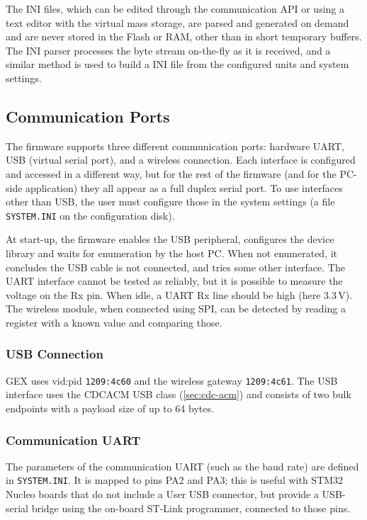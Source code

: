 The INI files, which can be edited through the communication \gls{API} or using a text editor with the virtual mass storage, are parsed and generated on demand and are never stored in the Flash or \gls{RAM}, other than in short temporary buffers. The INI parser processes the byte stream on-the-fly as it is received, and a similar method is used to build a INI file from the configured units and system settings.

\subsection{Communication Ports} \label{sec:com-ports}

The firmware supports three different communication ports: hardware \gls{UART}, \gls{USB} (virtual serial port), and a wireless connection. Each interface is configured and accessed in a different way, but for the rest of the firmware (and for the \gls{PC}-side application) they all appear as a full duplex serial port. To use interfaces other than \gls{USB}, the user must configure those in the system settings (a file \verb|SYSTEM.INI| on the configuration disk).

At start-up, the firmware enables the \gls{USB} peripheral, configures the device library and waits for enumeration by the host \gls{PC}. When not enumerated, it concludes the \gls{USB} cable is not connected, and tries some other interface. The \gls{UART} interface cannot be tested as reliably, but it is possible to measure the voltage on the Rx pin. When idle, a \gls{UART} Rx line should be high (here 3.3\,V). The wireless module, when connected using \gls{SPI}, can be detected by reading a register with a known value and comparing those.

\subsubsection{USB Connection}

GEX uses vid:pid \verb|1209:4c60| and the wireless gateway \verb|1209:4c61|. The \gls{USB} interface uses the \gls{CDCACM} \gls{USB} class (\ref{sec:cdc-acm}) and consists of two bulk endpoints with a payload size of up to 64 bytes.

\subsubsection{Communication UART}

The parameters of the communication \gls{UART} (such as the baud rate) are defined in \verb|SYSTEM.INI|. It is mapped to pins PA2 and PA3; this is useful with STM32 Nucleo boards that do not include a User \gls{USB} connector, but provide a \gls{USB}-serial bridge using the on-board ST-Link programmer, connected to those pins.

